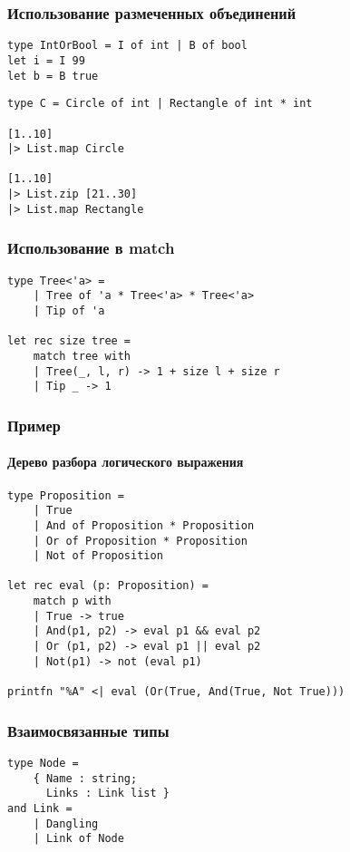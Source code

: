 \documentclass{../../slides-style}
\begin{document}
    \begin{frame}[fragile]
        \frametitle{Использование размеченных объединений}
        \begin{verbatim}
type IntOrBool = I of int | B of bool
let i = I 99
let b = B true
        \end{verbatim}
        
        \begin{verbatim}
type C = Circle of int | Rectangle of int * int

[1..10]
|> List.map Circle

[1..10]
|> List.zip [21..30]
|> List.map Rectangle
        \end{verbatim}
    \end{frame}

    \begin{frame}[fragile]
        \frametitle{Использование в match}
        \begin{verbatim}
type Tree<'a> =
    | Tree of 'a * Tree<'a> * Tree<'a>
    | Tip of 'a

let rec size tree =
    match tree with
    | Tree(_, l, r) -> 1 + size l + size r
    | Tip _ -> 1
        \end{verbatim}
    \end{frame}

    \begin{frame}[fragile]
        \frametitle{Пример}
        \framesubtitle{Дерево разбора логического выражения}
        \begin{verbatim}
type Proposition =
    | True
    | And of Proposition * Proposition
    | Or of Proposition * Proposition
    | Not of Proposition

let rec eval (p: Proposition) =
    match p with
    | True -> true
    | And(p1, p2) -> eval p1 && eval p2
    | Or (p1, p2) -> eval p1 || eval p2
    | Not(p1) -> not (eval p1)

printfn "%A" <| eval (Or(True, And(True, Not True)))
        \end{verbatim}
    \end{frame}

    \begin{frame}[fragile]
        \frametitle{Взаимосвязанные типы}
        \begin{verbatim}
type Node =
    { Name : string;
      Links : Link list }
and Link =
    | Dangling
    | Link of Node
        \end{verbatim}
    \end{frame}
\end{document}
